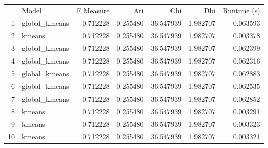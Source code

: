 \begin{tabular}{rlrrrrr}
 & Model & F Measure & Ari & Chi & Dbi & Runtime (s) \\
1 & global_kmeans & 0.712228 & 0.255480 & 36.547939 & 1.982707 & 0.063593 \\
2 & kmeans & 0.712228 & 0.255480 & 36.547939 & 1.982707 & 0.003378 \\
3 & global_kmeans & 0.712228 & 0.255480 & 36.547939 & 1.982707 & 0.062399 \\
4 & global_kmeans & 0.712228 & 0.255480 & 36.547939 & 1.982707 & 0.062316 \\
5 & global_kmeans & 0.712228 & 0.255480 & 36.547939 & 1.982707 & 0.062883 \\
6 & global_kmeans & 0.712228 & 0.255480 & 36.547939 & 1.982707 & 0.062535 \\
7 & global_kmeans & 0.712228 & 0.255480 & 36.547939 & 1.982707 & 0.062852 \\
8 & kmeans & 0.712228 & 0.255480 & 36.547939 & 1.982707 & 0.003291 \\
9 & kmeans & 0.712228 & 0.255480 & 36.547939 & 1.982707 & 0.003323 \\
10 & kmeans & 0.712228 & 0.255480 & 36.547939 & 1.982707 & 0.003321 \\
\end{tabular}
